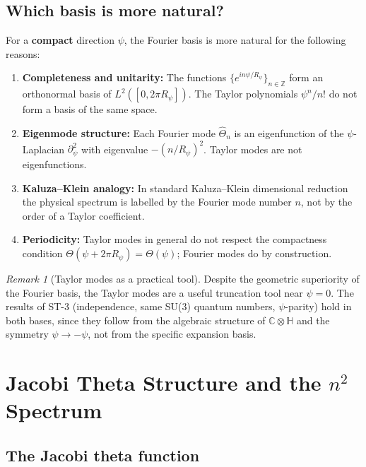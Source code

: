 \documentclass[12pt,a4paper]{article}
\theoremstyle{remark}
\newtheorem{remark}[theorem]{Remark}
\newcommand{\C}{\mathbb{C}}
\newcommand{\H}{\mathbb{H}}
\newcommand{\Z}{\mathbb{Z}}
\begin{document}
\subsection{Which basis is more natural?}

For a \textbf{compact} direction $\psi$, the Fourier basis is more natural
for the following reasons:
\begin{enumerate}[label=(\roman*)]
  \item \textbf{Completeness and unitarity:}  The functions
        $\{e^{in\psi/R_\psi}\}_{n\in\Z}$ form an orthonormal basis of
        $L^2([0,2\pi R_\psi])$.  The Taylor polynomials $\psi^n/n!$ do not
        form a basis of the same space.
  \item \textbf{Eigenmode structure:}  Each Fourier mode $\hat\Theta_n$ is
        an eigenfunction of the $\psi$-Laplacian $\partial_\psi^2$ with
        eigenvalue $-(n/R_\psi)^2$.  Taylor modes are not eigenfunctions.
  \item \textbf{Kaluza--Klein analogy:}  In standard Kaluza--Klein
        dimensional reduction the physical spectrum is labelled by the
        Fourier mode number $n$, not by the order of a Taylor coefficient.
  \item \textbf{Periodicity:}  Taylor modes in general do not respect the
        compactness condition $\Theta(\psi+2\pi R_\psi)=\Theta(\psi)$;
        Fourier modes do by construction.
\end{enumerate}

\begin{remark}[Taylor modes as a practical tool]
Despite the geometric superiority of the Fourier basis, the Taylor modes
are a useful truncation tool near $\psi=0$.  The results of ST-3
(independence, same SU(3) quantum numbers, $\psi$-parity) hold in both
bases, since they follow from the algebraic structure of $\C\otimes\H$
and the symmetry $\psi\to-\psi$, not from the specific expansion basis.
\end{remark}

\section{Jacobi Theta Structure and the $n^2$ Spectrum}
\label{sec:jacobi}

\subsection{The Jacobi theta function}
\end{document}
